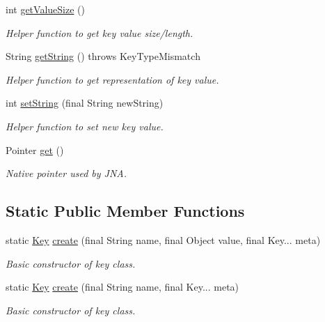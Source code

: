 \begin{DoxyCompactItemize}
int \hyperlink{classorg_1_1libelektra_1_1Key_aeb1c3e899a17778c8511a08ee0472e43}{get\+Value\+Size} ()
\begin{DoxyCompactList}\small\item\em Helper function to get key value size/length. \end{DoxyCompactList}\item 
String \hyperlink{classorg_1_1libelektra_1_1Key_a3464485c19d49b6763f6c831cf5ed06c}{get\+String} ()  throws Key\+Type\+Mismatch 	
\begin{DoxyCompactList}\small\item\em Helper function to get representation of key value. \end{DoxyCompactList}\item 
int \hyperlink{classorg_1_1libelektra_1_1Key_a5ccfaddf110c47c83686655a694ee76d}{set\+String} (final String new\+String)
\begin{DoxyCompactList}\small\item\em Helper function to set new key value. \end{DoxyCompactList}\item 
Pointer \hyperlink{classorg_1_1libelektra_1_1Key_a3c65267ac3d24c3eae35db576414fe4f}{get} ()
\begin{DoxyCompactList}\small\item\em Native pointer used by J\+NA. \end{DoxyCompactList}\end{DoxyCompactItemize}
\subsection*{Static Public Member Functions}
\begin{DoxyCompactItemize}
\item 
static \hyperlink{classorg_1_1libelektra_1_1Key}{Key} \hyperlink{classorg_1_1libelektra_1_1Key_a785f6b8e937d51575a4acc2ebc8f19a2}{create} (final String name, final Object value, final Key... meta)
\begin{DoxyCompactList}\small\item\em Basic constructor of key class. \end{DoxyCompactList}\item 
static \hyperlink{classorg_1_1libelektra_1_1Key}{Key} \hyperlink{classorg_1_1libelektra_1_1Key_a77ab77c48bcb237724581d914abbd7fe}{create} (final String name, final Key... meta)
\begin{DoxyCompactList}\small\item\em Basic constructor of key class. \end{DoxyCompactList}\end{DoxyCompactItemize}
